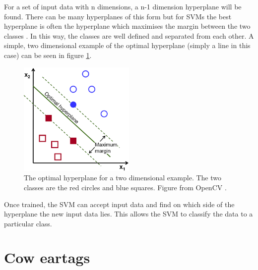 For a set of input data with n dimensions, a n-1 dimension hyperplane will be found. There can be many hyperplanes of this form but for SVMs the best hyperplane is often the hyperplane which maximises the margin between the two classes \cite{Jordan2008}. In this way, the classes are well defined and separated from each other. A simple, two dimensional example of the optimal hyperplane (simply a line in this case) can be seen in figure \ref{SVM}.

\begin{figure}[H]
\begin{center}
\leavevmode
\includegraphics[width=0.5\textwidth]{images/svm.png}
\end{center}
\caption{The optimal hyperplane for a two dimensional example. The two classes are the red circles and blue squares. Figure from OpenCV \cite{SVM}.}
\label{SVM}
\end{figure}

Once trained, the SVM can accept input data and find on which side of the hyperplane the new input data lies. This allows the SVM to classify the data to a particular class. 
\section{Cow eartags}

